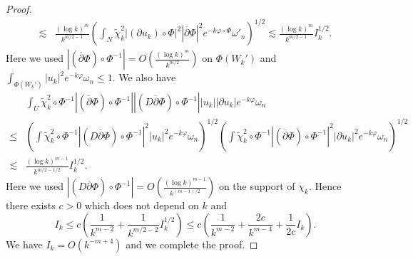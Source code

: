 \documentclass[10pt,a4paper]{amsart}
\begin{document}
\begin{proof}
\begin{align*}
\lesssim & 
\frac{(\log k)^{m}}{k^{m/2-1}}
\left(\int_{N} \tilde{\chi}^2_{k} |(\partial u_{k})\circ \Phi|^2 |\overline{\partial} \Phi|^2 e^{-k \varphi\circ \Phi} \omega'_{n} \right)^{1/2} 
\lesssim 
\frac{(\log k)^{m}}{k^{m/2-1}} I_{k}^{1/2}.  
\end{align*}
Here we used $|(\overline{\partial} \Phi) \circ \Phi^{-1}| = O(\frac{(\log k)^m}{k^{m/2}})$ on $\Phi(W_k')$ and $\int_{\Phi(W_k')} |u_k|^2e^{-k\varphi} \omega_n \leq 1$.  
We also have 
\begin{align*}
& \int_{U} \tilde{\chi}^2_{k}\circ \Phi^{-1} |(\overline{\partial} \Phi)\circ \Phi^{-1}| |(D \overline{\partial} \Phi) \circ \Phi^{-1}| |u_{k}| |\partial u_{k}|e^{-k \varphi}\omega_{n} \\
\leq & 
\left(\int \tilde{\chi}^2_{k}\circ \Phi^{-1} |(D\overline{\partial} \Phi) \circ \Phi^{-1}|^2 |u_{k}|^2 e^{-k\varphi}\omega_{n} \right)^{1/2}
\left(\int \tilde{\chi}^2_{k} \circ\Phi^{-1} |(\overline{\partial} \Phi) \circ \Phi^{-1}|^2 |\partial u_{k}|^2 e^{-k\varphi}\omega_{n} \right)^{1/2} \\
\lesssim & 
\frac{(\log k)^{m-1}}{k^{m/2-1/2}} I_{k}^{1/2}.
\end{align*}
Here we used $|(D\overline{\partial} \Phi) \circ \Phi^{-1}| = O(\frac{(\log k)^{m-1}}{k^{(m-1)/2}})$ on the support of $\chi_k$.  
Hence there exists $c > 0$ which does not depend on $k$ and 
\[
I_{k} \leq c \left( \frac{1}{k^{m-2}} + \frac{1}{k^{m/2-2}} I_{k}^{1/2} \right) 
\leq 
c \left(\frac{1}{k^{m-2}} + \frac{2c}{k^{m-4}} + \frac{1}{2c}I_{k} \right).  
\]
We have $I_{k} = O(k^{-m+4})$ and we complete the proof.  
\end{proof}
\end{document}
